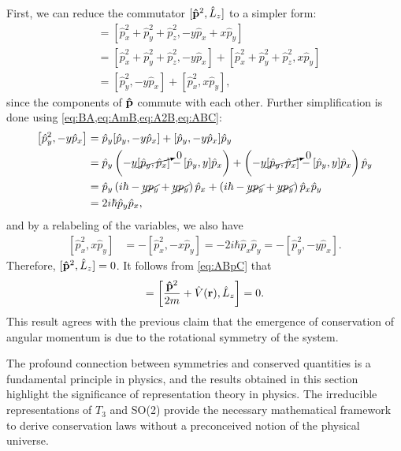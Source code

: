 First, we can reduce the commutator $[\mathbf{\hat{p}}^2,\hat{L}_z]$ to a simpler form:
\begin{align*}
    [\vh{p}^2,\hat{L}_z]
        &= \left[ \hat{p}_x^2 + \hat{p}_y^2 + \hat{p}_z^2, -y \hat{p}_x + x \hat{p}_y \right] \\
        &= \left[ \hat{p}_x^2 + \hat{p}_y^2 + \hat{p}_z^2, -y \hat{p}_x \right] + \left[ \hat{p}_x^2 + \hat{p}_y^2 + \hat{p}_z^2, x \hat{p}_y \right] \\
        &= \left[ \hat{p}_y^2, -y \hat{p}_x \right] + \left[ \hat{p}_x^2, x \hat{p}_y \right],
\end{align*}
since the components of $\mathbf{\hat{p}}$ commute with each other. Further simplification is done using \cref{eq:BA,eq:AmB,eq:A2B,eq:ABC}:
\begin{align*}
    \left[ \hat{p}_y^2, -y \hat{p}_x \right]
        &= \hat{p}_y [\hat{p}_y, -y \hat{p}_x ] + [\hat{p}_y, -y \hat{p}_x ]\hat{p}_y \\
        &= \hat{p}_y \left( -y \cancelto{0}{[\hat{p}_y, \hat{p}_x ]} - [\hat{p}_y, y] \hat{p}_x \right) + \left( -y \cancelto{0}{[\hat{p}_y, \hat{p}_x ]} - [\hat{p}_y, y] \hat{p}_x \right)\hat{p}_y \\
        &= \hat{p}_y \left( i\hbar - \cancel{yp_y} + \cancel{yp_y} \right) \hat{p}_x + \left( i\hbar - \cancel{yp_y} + \cancel{yp_y} \right) \hat{p}_x\hat{p}_y \\
        &= 2i\hbar \hat{p}_y \hat{p}_x,
\end{align*}
and by a relabeling of the variables, we also have
\begin{align*}
    \left[ \hat{p}_x^2, x \hat{p}_y \right] &= -\left[ \hat{p}_x^2, -x \hat{p}_y \right] = -2i\hbar \hat{p}_x \hat{p}_y = -\left[ \hat{p}_y^2, -y \hat{p}_x \right].
\end{align*}
Therefore, $[\mathbf{\hat{p}}^2,\hat{L}_z] = 0$. It follows from \cref{eq:ABpC} that
\begin{align*}
    [\hat{H},\hat{L}_z] = \left[ \frac{\vh{p}^2}{2m}  + \hat{V}(\vec{r}), \hat{L}_z \right] = 0.
\end{align*}
This result agrees with the previous claim that the emergence of conservation of angular momentum is due to the rotational symmetry of the system.

The profound connection between symmetries and conserved quantities is a fundamental principle in physics, and the results obtained in this section highlight the significance of representation theory in physics. The irreducible representations of $T_3$ and SO(2) provide the necessary mathematical framework to derive conservation laws without a preconceived notion of the physical universe.

